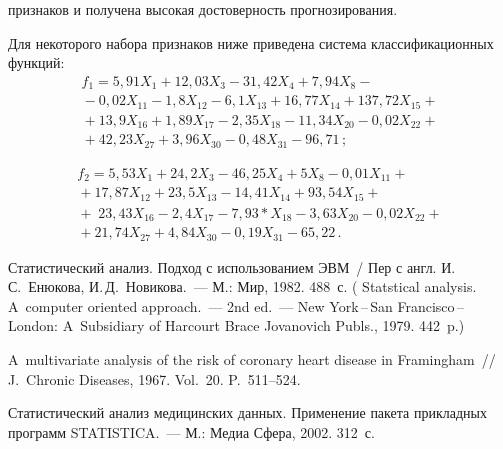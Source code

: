 \begin{multicols}{2}

\vspace*{12pt}

\addtocounter{figure}{1}   


\noindent
 признаков и получена высокая достоверность прогнозирования.

Для некоторого набора признаков ниже приведена система классификационных функций:
\begin{multline*}
f_1 =
5{,}91 X_1+12{,}03 X_3-31{,}42 X_4+7{,}94X_8-{}\\
{}-0{,}02X_{11}-1{,}8X_{12}-6{,}1X_{13}+16{,}77X_{14}+137{,}72X_{15}+{}\\
{}+13{,}9X_{16}+1{,}89X_{17}-2{,}35X_{18}-11{,}34X_{20}-0{,}02X_{22}+{}\\
{}+42{,}23X_{27} +3{,}96X_{30}-0{,}48X_{31}-96{,}71\,;
\end{multline*}

\vspace*{-12pt}

\noindent
\begin{multline*}
f_2 =
5{,}53X_1+24{,}2X_3-46{,}25X_4+5X_8-0{,}01X_{11}+{}\\
{}+17{,}87X_{12}+23{,}5X_{13}-14{,}41X_{14}+93{,}54X_{15}+{}
\\
{}+\;23{,}43X_{16}-2{,}4X_{17}-7{,}93*X_{18}-3{,}63X_{20}-0{,}02X_{22}+{}\\
{}+21{,}74X_{27}+4{,}84X_{30}-0{,}19X_{31}-65{,}22\,.
\end{multline*}

{\small\frenchspacing
{%
\begin{thebibliography}{9}


 Статистический анализ. Подход с
использованием ЭВМ~/ Пер с англ. И.\,С.~Енюкова, И.\,Д.~Новикова.~--- М.: Мир, 1982.
488~с. ( Statstical analysis. A~computer oriented
approach.~--- 2nd ed.~--- New York\,--\,San Francisco\,--\,London: A~Subsidiary of 
Harcourt Brace Jovanovich Publs., 1979. 442~p.)

 A~multivariate analysis of
the risk of coronary heart disease in Framingham~// J.~Chronic Diseases, 1967. 
Vol.~20. P.~511--524.

 Статистический анализ медицинских данных.
Применение пакета прикладных программ STATISTICA.~--- М.: Медиа Сфера, 2002. 312~с.


\end{thebibliography}}}
\end{multicols}
